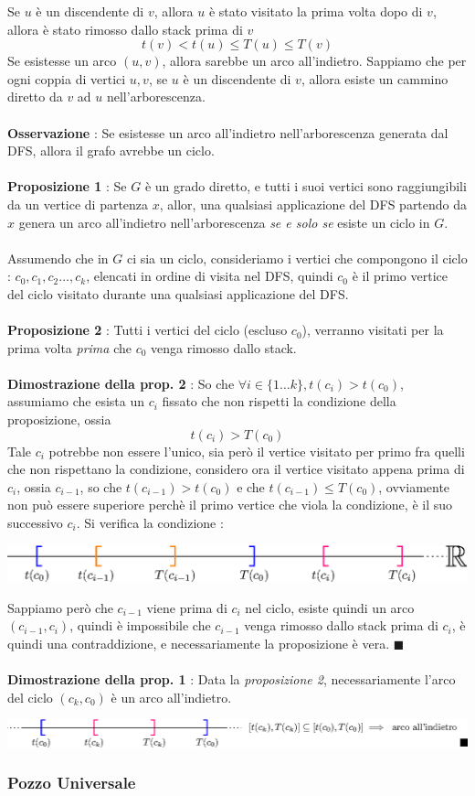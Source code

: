 \documentclass[12pt, letterpaper]{article}
\newcommand{\acc}{\\\hphantom{}\\}
\begin{document}
Se \(u\) è un discendente di \(v\), allora \(u\) è stato visitato la prima volta dopo di \(v\), allora è stato
rimosso dallo stack prima di \(v\) $$t(v)<t(u)\le T(u)\le T(v)$$
Se esistesse un arco $(u,v)$, allora sarebbe un arco all'indietro. Sappiamo che per ogni coppia di vertici
\(u,v\), se \(u\) è un discendente di \(v\), allora esiste un cammino diretto da \(v\) ad \(u\) nell'arborescenza.\acc
\textbf{Osservazione} : Se esistesse un arco all'indietro nell'arborescenza generata dal DFS, allora
il grafo avrebbe un ciclo.\acc
\textbf{Proposizione 1} : Se \(G\) è un grado diretto, e tutti i suoi vertici sono raggiungibili da un
vertice di partenza \(x\), allor, una qualsiasi applicazione del DFS partendo da \(x\) genera un
arco all'indietro nell'arborescenza \textit{se e solo se} esiste un ciclo in \(G\).\acc
Assumendo che in \(G\) ci sia un ciclo, consideriamo i vertici che compongono il ciclo :
$c_0,c_1,c_2\dots,c_k$, elencati in ordine di visita nel DFS, quindi \(c_0\) è il primo vertice del ciclo
visitato durante una qualsiasi applicazione del DFS.
\acc\textbf{Proposizione 2} : Tutti i vertici del ciclo (escluso $c_0$), verranno visitati per la prima
volta \textit{prima} che \(c_0\) venga rimosso dallo stack.\acc
\textbf{Dimostrazione della prop. 2} : So che $\forall i\in\{1\dots k\},t(c_i)>t(c_0)$, assumiamo che
esista un \(c_i\) fissato che non rispetti la condizione della proposizione, ossia $$t(c_i)>T(c_0)$$
Tale $c_i$ potrebbe non essere l'unico, sia però il vertice visitato per primo fra quelli che non rispettano
la condizione, considero ora il vertice visitato appena prima di $c_i$, ossia $c_{i-1}$, so che
$t(c_{i-1})>t(c_0)$ e che $t(c_{i-1})\le T(c_0)$, ovviamente non può essere superiore perchè il primo
vertice che viola la condizione, è il suo successivo $c_i$. Si verifica la condizione :
\begin{center}
    \includegraphics[width=1\textwidth ]{images/realLine.eps}
\end{center}
Sappiamo però che $c_{i-1}$ viene prima di $c_i$ nel ciclo, esiste quindi un arco $(c_{i-1},c_i)$, quindi
è impossibile che $c_{i-1}$ venga rimosso dallo stack prima di $c_i$, è quindi una contraddizione, e
necessariamente la proposizione è vera. \(\blacksquare\)\acc
\textbf{Dimostrazione della prop. 1} : Data la \textit{proposizione 2}, necessariamente l'arco del
ciclo \((c_k,c_0)\) è un arco all'indietro. \begin{center}
    \includegraphics[width=1\textwidth ]{images/realLine2.eps}
\end{center}\subsubsection{Pozzo Universale}
\end{document}
